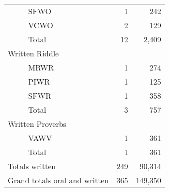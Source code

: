 \begin{longtable}{llrr}
		& SFWO & 1 & 242\\
		& VCWO & 2 & 129\\\addlinespace
		& Total & 12 &  2,409\\\midrule
		\multicolumn{4}{l}{Written Riddle}\\
		& MRWR & 1 & 274\\
		& PIWR & 1 & 125\\
		& SFWR & 1 & 358\\\addlinespace
		& Total & 3 &  757\\\midrule
		\multicolumn{4}{l}{Written Proverbs}\\
		& VAWV & 1 & 361\\\addlinespace
		& Total &  1 &  361\\\midrule
		\multicolumn{2}{l}{Totals written} & 249 & 90,314\\
		\multicolumn{2}{l}{Grand totals oral and written} & 365 & 149,350\\
	\end{longtable}
